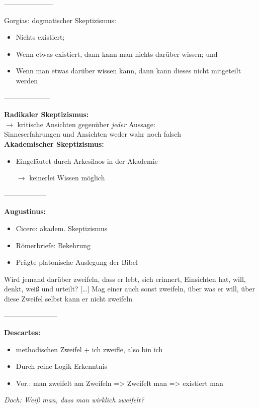 \documentclass[12pt,a4paper]{article}
\begin{document}
---------------------

Gorgias: dogmatischer Skeptizismus:
\begin{itemize}
\item Nichts existiert;
\item Wenn etwas existiert, dann kann man nichts darüber wissen; und
\item Wenn man etwas darüber wissen kann, dann kann dieses nicht mitgeteilt werden
\end{itemize}

--------------------

\textbf{Radikaler Skeptizismus:}\\
$\rightarrow$ kritische Ansichten gegenüber \emph{jeder} Aussage:\\
\glqq Sinneserfahrungen und Ansichten  weder wahr noch falsch\grqq\ \\
\textbf{Akademischer Skeptizismus:}\\
\begin{itemize}
\item Eingeläutet durch Arkesilaos in der Akademie
\item[$\rightarrow$] keinerlei Wissen möglich
\end{itemize}

------------------

\textbf{Augustinus:}\\
\begin{itemize}
\item Cicero: akadem. Skeptizismus
\item \glqq Römerbriefe\grqq : Bekehrung
\item Prägte platonische Auslegung der Bibel
\end{itemize}
\glqq Wird jemand darüber zweifeln, dass er lebt, sich erinnert, Einsichten hat, will, denkt, weiß und urteilt? [\ldots] Mag einer auch sonst zweifeln, über was er will, über diese Zweifel selbst kann er nicht zweifeln\grqq\

-----------------------

\textbf{Descartes:}
\begin{itemize}
\item  methodischen Zweifel +  \glqq ich zweifle, also bin ich\grqq
\item Durch reine Logik Erkenntnis
\item Vor.: man zweifelt am Zweifeln => Zweifelt man => existiert man
\end{itemize}
\emph{Doch: Weiß man, dass man wirklich zweifelt?}
\end{document}

